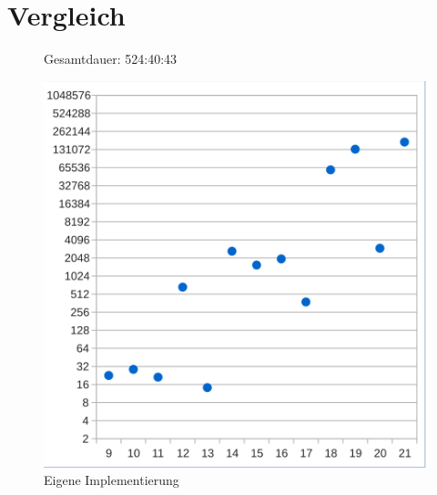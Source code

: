 \section{Vergleich}


\begin{figure}[!h]
  \centering
  \begin{minipage}[t]{0.45\textwidth}
  \begin{flushleft}Gesamtdauer: 524:40:43\end{flushleft}
  \includegraphics[scale=0.55]{images/eval_thesis}
  \end{minipage}
  \caption{Eigene Implementierung}
  \label{fig:eval_thesis}
\end{figure}


